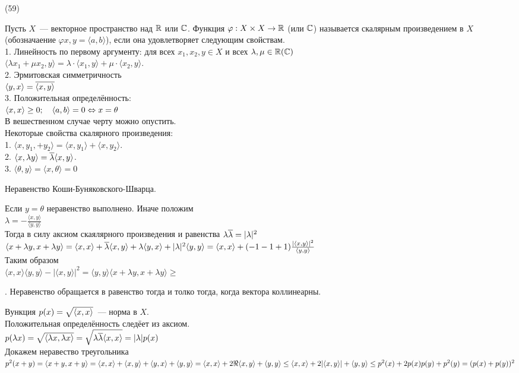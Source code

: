 (59)

\Op Пусть $X$~--- векторное пространство над $\mathbb{R}$ или $\mathbb{C}$. Функция $\varphi: X \times X \to \mathbb{R}$ (или $\mathbb{C}$) называется скалярным произведением в $X$ (обозначаение $\varphi{x, y} = \langle a, b \rangle$), если она  удовлетворяет следующим свойствам.\\
1. Линейность по первому аргументу: для всех $x_1, x_2, y \in X$ и всех $\lambda, \mu \in \mathbb{R}(\mathbb{C})$\\
$\langle\lambda x_1 + \mu x_2, y\rangle = \lambda \cdot\langle x_1, y\rangle + \mu\cdot\langle x_2, y\rangle$.\\
2. Эрмитовская симметричность\\
$\langle y, x\rangle = \overline{\langle x, y\rangle}$\\
3. Положительная определённость:\\
$\langle x, x\rangle \ge 0;\quad \langle a, b\rangle = 0 \Leftrightarrow x = \theta$\\
В вешественном случае черту можно опустить.\\
Некоторые свойства скалярного произведения:\\
1. $\langle x, y_1, + y_2\rangle = \langle x, y_1\rangle + \langle x, y_2\rangle$.\\
2. $\langle x, \lambda y\rangle = \overline{\lambda}\langle x, y\rangle$.\\
3. $\langle \theta, y\rangle = \langle x, \theta\rangle = 0$

\T \q Неравенство Коши-Буняковского-Шварца.

\D Если $y = \theta$ неравенство выполнено. Иначе положим\\
$\lambda = -\frac{\langle x, y\rangle}{\langle y, y\rangle}$\\
Тогда в силу аксиом скаялярного произведения и равенства $\lambda\overline{\lambda} = |\lambda|^2$\\
$\langle x + \lambda y, x + \lambda y\rangle = \langle x, x\rangle + \overline{\lambda}\langle x, y\rangle + \lambda\langle y, x\rangle + |\lambda|^2 \langle y, y\rangle = \langle x, x\rangle + (-1 -1 + 1)\frac{|\langle x, y\rangle|^2}{\langle y, y\rangle}$\\
Таким образом\\
$\langle x, x\rangle\langle y, y\rangle - |\langle x, y\rangle|^2 = \langle y, y\rangle\langle x + \lambda y, x + \lambda y\rangle \ge $

. Неравенство обращается в равенство тогда и толко тогда, когда вектора коллинеарны.

Вункция $p(x) = \sqrt{\langle x, x \rangle}$~--- норма в $X$.\\
Положительная определённость следёет из аксиом.\\
$p(\lambda x) = \sqrt{\langle \lambda x, \lambda x \rangle} = \sqrt{\lambda\overline{\lambda}\langle x, x \rangle}= |\lambda| p(x)$\\
Докажем неравество треугольника\\
$p^2(x + y) = \langle x + y, x + y \rangle = \langle x, x \rangle + \langle x, y \rangle + \langle y, x \rangle + \langle y, y \rangle = \langle x, x \rangle + 2\Re\langle x, y \rangle + \langle y, y \rangle \le \langle x, x \rangle + 2|\langle x, y \rangle| + \langle y, y \rangle \le p^2(x) + 2p(x)p(y) + p^2(y) = (p(x) + p(y))^2$\\

